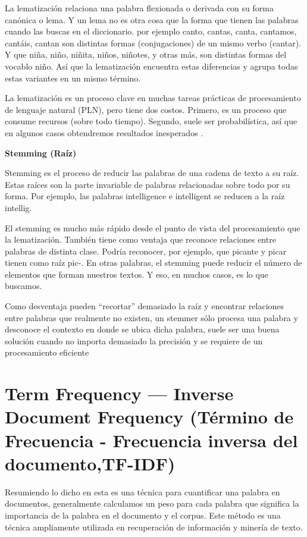 La lematización relaciona una palabra flexionada o derivada con su forma canónica o lema. 
Y un lema no es otra cosa que la forma que tienen las palabras cuando las buscas en el diccionario.
por ejemplo  canto, cantas, canta, cantamos, cantáis, cantan son distintas formas (conjugaciones) de un mismo verbo (cantar).
Y que niña, niño, niñita, niños, niñotes, y otras más, son distintas formas del vocablo niño. Así que la lematización encuentra estas 
diferencias y agrupa todas estas variantes en un mismo término.

La lematización es un proceso clave en muchas tareas prácticas de procesamiento de lenguaje natural (PLN), pero tiene dos costos. Primero,
es un proceso que consume recursos (sobre todo tiempo). Segundo, suele ser probabilística, 
así que en algunos casos obtendremos resultados inesperados \cite{LinoAlbertoUrdanetaFernandez}.



\textbf{Stemming (Raíz)}

Stemming es el proceso de reducir las palabras de una cadena de texto a su raíz.
Estas raíces son la parte invariable de palabras relacionadas sobre todo por su forma. Por ejemplo,
las palabras intelligence e intelligent se reducen a la raíz intellig.

El stemming es mucho más rápido desde el punto de vista del procesamiento que la lematización. 
También tiene como ventaja que reconoce relaciones entre palabras de distinta clase. Podría reconocer,
por ejemplo, que picante y picar tienen como raíz pic-. En otras palabras,
el stemming puede reducir el número de elementos que forman nuestros textos.
Y eso, en muchos casos, es lo que buscamos.

Como desventaja pueden “recortar” demasiado la raíz y encontrar relaciones entre palabras que realmente no existen,
un stemmer sólo procesa una palabra y desconoce el contexto en donde se ubica dicha palabra,
suele ser una buena solución cuando no importa demasiado la precisión y se requiere de un procesamiento eficiente


\section{Term Frequency — Inverse Document Frequency (Término de Frecuencia - Frecuencia inversa del documento,TF-IDF)}

Resumiendo lo dicho en \cite{aggarwal2012mining} esta es una técnica para cuantificar una palabra en documentos, generalmente calculamos un peso para cada 
palabra que significa la importancia de la palabra en el documento y el corpus. Este método es una técnica ampliamente utilizada
en recuperación de información y minería de texto.

